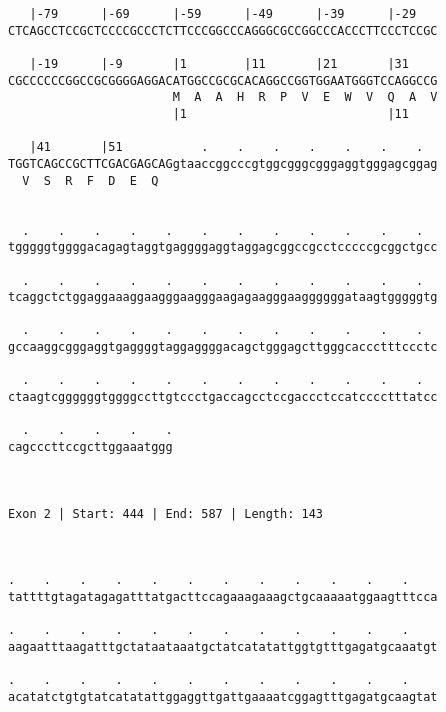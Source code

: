 \documentclass{article}
\begin{document}
\begin{Verbatim}
   |-79      |-69      |-59      |-49      |-39      |-29   
CTCAGCCTCCGCTCCCCGCCCTCTTCCCGGCCCAGGGCGCCGGCCCACCCTTCCCTCCGC
                                                            
   |-19      |-9       |1        |11       |21       |31    
CGCCCCCCGGCCGCGGGGAGGACATGGCCGCGCACAGGCCGGTGGAATGGGTCCAGGCCG
                       M  A  A  H  R  P  V  E  W  V  Q  A  V
                       |1                            |11    
  
   |41       |51           .    .    .    .    .    .    .  
TGGTCAGCCGCTTCGACGAGCAGgtaaccggcccgtggcgggcgggaggtgggagcggag
  V  S  R  F  D  E  Q                                       
                                                            
  
  .    .    .    .    .    .    .    .    .    .    .    .  
tgggggtggggacagagtaggtgaggggaggtaggagcggccgcctcccccgcggctgcc
                                                            
  .    .    .    .    .    .    .    .    .    .    .    .  
tcaggctctggaggaaaggaagggaagggaagagaagggaaggggggataagtgggggtg
                                                            
  .    .    .    .    .    .    .    .    .    .    .    .  
gccaaggcgggaggtgaggggtaggaggggacagctgggagcttgggcaccctttccctc
                                                            
  .    .    .    .    .    .    .    .    .    .    .    .  
ctaagtcggggggtggggccttgtccctgaccagcctccgaccctccatcccctttatcc
                                                            
  .    .    .    .    .
cagcccttccgcttggaaatggg
                       
                       
 
Exon 2 | Start: 444 | End: 587 | Length: 143



.    .    .    .    .    .    .    .    .    .    .    .    
tattttgtagatagagatttatgacttccagaaagaaagctgcaaaaatggaagtttcca
                                                            
.    .    .    .    .    .    .    .    .    .    .    .    
aagaatttaagatttgctataataaatgctatcatatattggtgtttgagatgcaaatgt
                                                            
.    .    .    .    .    .    .    .    .    .    .    .    
acatatctgtgtatcatatattggaggttgattgaaaatcggagtttgagatgcaagtat
                                                            

\end{Verbatim}
\end{document}
